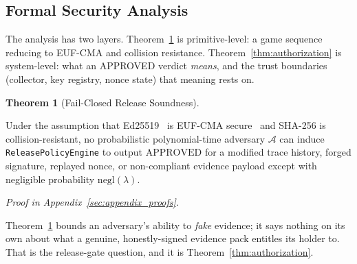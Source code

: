 \documentclass[letterpaper,10pt,twocolumn]{article}
\theoremstyle{definition}
\newtheorem{theorem}{Theorem}
\begin{document}
\subsection{Formal Security Analysis}\label{sec:proofs}

The analysis has two layers. Theorem~\ref{thm:failclosed} is primitive-level: a game sequence reducing to EUF-CMA and collision resistance. Theorem~\ref{thm:authorization} is system-level: what an APPROVED verdict \emph{means}, and the trust boundaries  (collector, key registry, nonce state)  that meaning rests on.

\begin{theorem}[Fail-Closed Release Soundness]\label{thm:failclosed}

Under the assumption that Ed25519~\cite{bernstein2012high} is EUF-CMA secure~\cite{goldwasser1988digital, brendel2021ed25519} and SHA-256 is collision-resistant, no probabilistic polynomial-time adversary $\mathcal{A}$ can induce \textnormal{\texttt{ReleasePolicyEngine}} to output $\text{APPROVED}$ for a modified trace history, forged signature, replayed nonce, or non-compliant evidence payload except with negligible probability $\text{negl}(\lambda)$.
\end{theorem}

\noindent\emph{Proof in Appendix~\ref{sec:appendix_proofs}.}

Theorem~\ref{thm:failclosed} bounds an adversary's ability to \emph{fake} evidence; it says nothing on its own about what a genuine, honestly-signed evidence pack entitles its holder to. That is the release-gate question, and it is Theorem~\ref{thm:authorization}.
\end{document}
